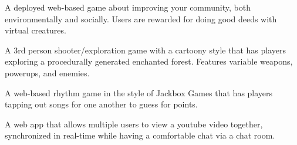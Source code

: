 \documentclass[10pt,a4paper,ragged2e,withhyper]{altacv}
\begin{document}
\begin{paracol}{2}
\divider{}

\small{}A deployed web-based game about improving your community, both environmentally and socially.
Users are rewarded for doing good deeds with virtual creatures.

\divider{}

\small{}A 3rd person shooter/exploration game with a cartoony style that has players exploring a procedurally generated enchanted forest.
Features variable weapons, powerups, and enemies.

\divider{}

\small{}A web-based rhythm game in the style of Jackbox Games that has players tapping out songs for one another to guess for points.

\divider{}

\small{}A web app that allows multiple users to view a youtube video together, synchronized in real-time while having a comfortable chat via a chat room.

\divider{}

\medskip




\switchcolumn{}

\divider{}

\divider{}

\divider{}

\divider{}

\divider{}

\divider{}

\divider{}

\divider{}

\divider{}


\divider{}


\end{paracol}
\end{document}
